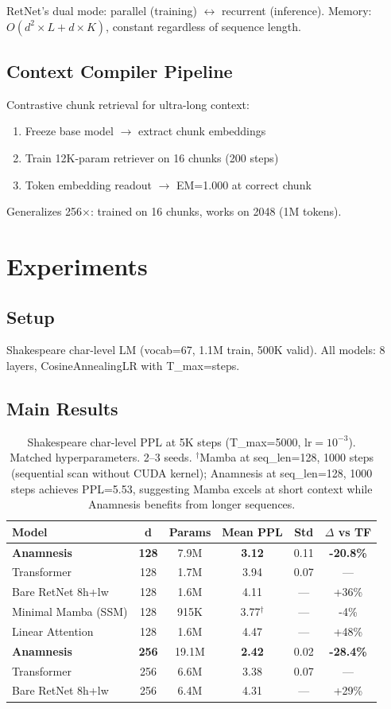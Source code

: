 \documentclass[twocolumn]{article}
\begin{document}
RetNet's dual mode: parallel (training) $\leftrightarrow$ recurrent (inference).
Memory: $O(d^2 \times L + d \times K)$, constant regardless of sequence length.

\subsection{Context Compiler Pipeline}

Contrastive chunk retrieval for ultra-long context:
\begin{enumerate}
\item Freeze base model $\rightarrow$ extract chunk embeddings
\item Train 12K-param retriever on 16 chunks (200 steps)
\item Token embedding readout $\rightarrow$ EM=1.000 at correct chunk
\end{enumerate}
Generalizes 256$\times$: trained on 16 chunks, works on 2048 (1M tokens).

\section{Experiments}

\subsection{Setup}
Shakespeare char-level LM (vocab=67, 1.1M train, 500K valid).
All models: 8 layers, CosineAnnealingLR with T\_max=steps.

\subsection{Main Results}

\begin{table}[h]
\centering
\caption{Shakespeare char-level PPL at 5K steps (T\_max=5000, lr$=10^{-3}$). Matched hyperparameters. 2--3 seeds. $^\dagger$Mamba at seq\_len=128, 1000 steps (sequential scan without CUDA kernel); Anamnesis at seq\_len=128, 1000 steps achieves PPL=5.53, suggesting Mamba excels at short context while Anamnesis benefits from longer sequences.}
\begin{tabular}{lccccc}
\toprule
Model & d & Params & Mean PPL & Std & $\Delta$ vs TF \\
\midrule
\textbf{Anamnesis} & \textbf{128} & 7.9M & \textbf{3.12} & 0.11 & \textbf{-20.8\%} \\
Transformer & 128 & 1.7M & 3.94 & 0.07 & — \\
Bare RetNet 8h+lw & 128 & 1.6M & 4.11 & — & +36\% \\
Minimal Mamba (SSM) & 128 & 915K & 3.77$^\dagger$ & — & -4\% \\
Linear Attention & 128 & 1.6M & 4.47 & — & +48\% \\
\midrule
\textbf{Anamnesis} & \textbf{256} & 19.1M & \textbf{2.42} & 0.02 & \textbf{-28.4\%} \\
Transformer & 256 & 6.6M & 3.38 & 0.07 & — \\
Bare RetNet 8h+lw & 256 & 6.4M & 4.31 & — & +29\% \\
\bottomrule
\end{tabular}
\end{table}
\end{document}
